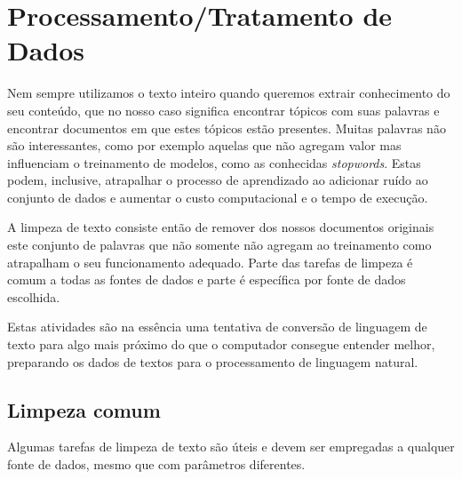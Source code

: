 \section{Processamento/Tratamento de Dados}

Nem sempre utilizamos o texto inteiro quando queremos extrair conhecimento do seu conteúdo, que no nosso caso significa encontrar tópicos com suas palavras e 
encontrar documentos em que estes tópicos estão presentes. Muitas palavras não são interessantes, como por exemplo aquelas que não agregam valor 
mas influenciam o treinamento de modelos, como as conhecidas \textit{stopwords}. Estas podem, inclusive, atrapalhar o processo de aprendizado 
ao adicionar ruído ao conjunto de dados e aumentar o custo computacional e o tempo de execução.

A limpeza de texto consiste então de remover dos nossos documentos originais este conjunto de palavras que não somente não agregam ao treinamento como atrapalham 
o seu funcionamento adequado. Parte das tarefas de limpeza é comum a todas as fontes de dados e parte é específica por fonte de dados escolhida.

Estas atividades são na essência uma tentativa de conversão de linguagem de texto para algo mais próximo do que o computador consegue entender melhor,
preparando os dados de textos para o processamento de linguagem natural.

\subsection{Limpeza comum}

Algumas tarefas de limpeza de texto são úteis e devem ser empregadas a qualquer fonte de dados, mesmo que com parâmetros diferentes.

